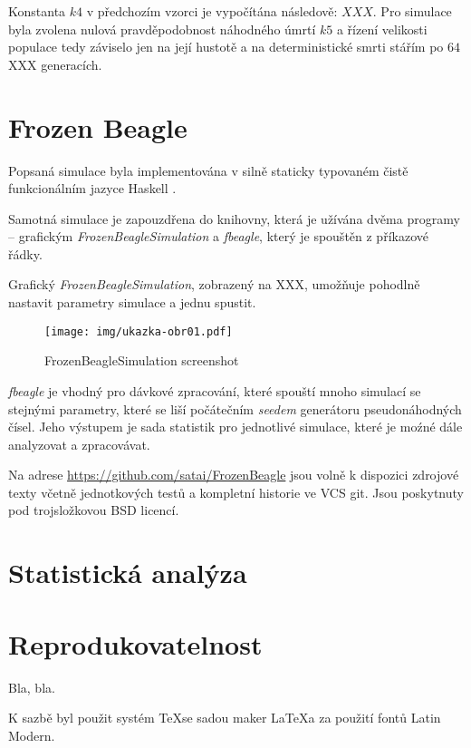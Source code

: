 Konstanta $k4$ v předchozím vzorci je vypočítána následově: $XXX$. Pro simulace byla zvolena nulová pravděpodobnost
náhodného úmrtí $k5$ a řízení velikosti populace tedy záviselo jen na její hustotě a na deterministické smrti
stářím po $64$ XXX generacích.


\section{Frozen Beagle}

Popsaná simulace byla implementována v silně staticky typovaném čistě funkcionálním jazyce Haskell \cite{Haskell}.

Samotná simulace je zapouzdřena do knihovny, která je užívána dvěma programy -- grafickým
\textit{FrozenBeagleSimulation} a \textit{fbeagle}, který je spouštěn z příkazové řádky.

Grafický \textit{FrozenBeagleSimulation}, zobrazený na XXX,
umožňuje pohodlně nastavit parametry simulace a jednu spustit.



\begin{figure}
\centering
\texttt{[image: img/ukazka-obr01.pdf]}
    \caption{FrozenBeagleSimulation screenshot}
\end{figure}


\textit{fbeagle} je vhodný pro dávkové zpracování, které spouští mnoho simulací se stejnými parametry, které se liší počátečním \textit{seedem} generátoru pseudonáhodných čísel. Jeho výstupem je sada statistik pro jednotlivé simulace, které je moźné dále analyzovat a zpracovávat.

Na adrese \url {https://github.com/satai/FrozenBeagle} jsou volně k dispozici zdrojové texty včetně jednotkových testů a kompletní historie ve VCS git. Jsou poskytnuty pod trojsložkovou BSD licencí.

\section{Statistická analýza}

\section{Reprodukovatelnost}

Bla, bla.

K sazbě byl použit systém \TeX se sadou maker \LaTeX a za použití fontů Latin Modern.
